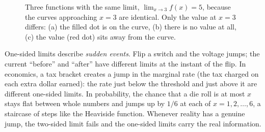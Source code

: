 \begin{figure}[htbp]
\centering
{}
\caption{Three functions with the same limit, $\lim_{x\to 3} f(x) = 5$, because the curves
approaching $x=3$ are identical. Only the value at $x=3$ differs: (a) the filled dot is on the
curve, (b) there is no value at all, (c) the value (red dot) sits away from the curve.}
\label{ch05:three-cases}
\end{figure}

\begin{applicationbox}
One-sided limits describe \emph{sudden
events}. Flip a switch and the voltage jumps; the current ``before'' and ``after'' have
different limits at the instant of the flip. In economics, a tax bracket creates a jump in the
marginal rate (the tax charged on each extra dollar earned): the rate just below the threshold
and just above it are different one-sided limits. In probability, the chance that a die roll is
at most $x$ stays flat between whole numbers and jumps up by $1/6$ at each of $x = 1, 2, \dots, 6$,
a staircase of steps like the Heaviside function. Whenever reality has a genuine jump, the two-sided
limit fails and the one-sided limits carry the real information.
\end{applicationbox}

